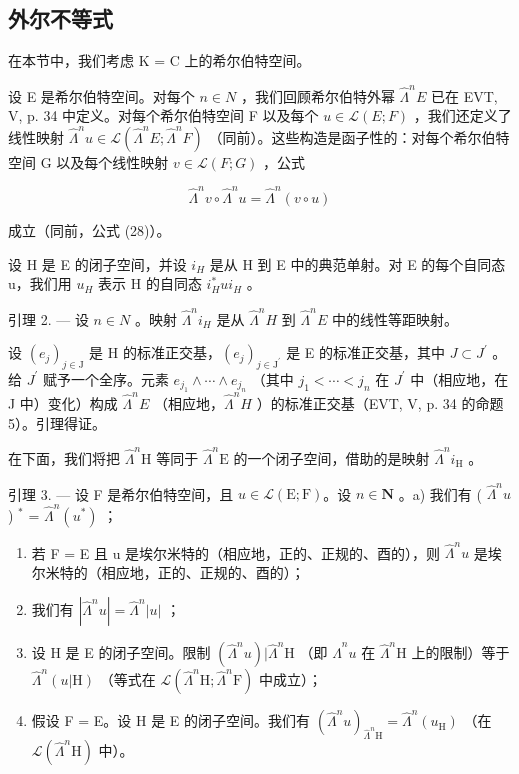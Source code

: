 \subsection{外尔不等式}

在本节中，我们考虑 K = C 上的希尔伯特空间。

设 E 是希尔伯特空间。对每个 \(n \in N\) ，我们回顾希尔伯特外幂 \(\hat{\Lambda}^{n}E\) 已在 EVT, V, p. 34 中定义。对每个希尔伯特空间 F 以及每个 \(u \in \mathcal{L}(E;F)\) ，我们还定义了线性映射 \(\hat{\Lambda}^{n}u \in \mathcal{L}(\hat{\Lambda}^{n}E;\hat{\Lambda}^{n}F)\) （同前）。这些构造是函子性的：对每个希尔伯特空间 G 以及每个线性映射 \(v \in \mathcal{L}(F;G)\) ，公式

\[
\widehat {\Lambda} ^ {n} v \circ \widehat {\Lambda} ^ {n} u = \widehat {\Lambda} ^ {n} (v \circ u)
\]

成立（同前，公式 (28)）。

设 H 是 E 的闭子空间，并设 \(i_{H}\) 是从 H 到 E 中的典范单射。对 E 的每个自同态 u，我们用 \(u_{H}\) 表示 H 的自同态 \(i_{H}^{*}ui_{H}\) 。

引理 2. --- 设 \(n \in N\) 。映射 \(\hat{\Lambda}^{n}i_{H}\) 是从 \(\hat{\Lambda}^{n}H\) 到 \(\hat{\Lambda}^{n}E\) 中的线性等距映射。

设 \((e_{j})_{j\in\mathrm{J}}\) 是 H 的标准正交基，\((e_{j})_{j\in\mathrm{J}^{\prime}}\) 是 E 的标准正交基，其中 \(J\subset J^{\prime}\) 。给 \(J^{\prime}\) 赋予一个全序。元素 \(e_{j_{1}}\wedge\cdots\wedge e_{j_{n}}\) （其中 \(j_{1}<\cdots<j_{n}\) 在 \(J^{\prime}\) 中（相应地，在 J 中）变化）构成 \(\widehat{\Lambda}^{n}E\) （相应地，\(\widehat{\Lambda}^{n}H\) ）的标准正交基（EVT, V, p. 34 的命题 5）。引理得证。

在下面，我们将把 \(\hat{\Lambda}^n\mathrm{H}\) 等同于 \(\hat{\Lambda}^n\mathrm{E}\) 的一个闭子空间，借助的是映射 \(\hat{\Lambda}^n i_{\mathrm{H}}\) 。

引理 3. --- 设 F 是希尔伯特空间，且 \(u \in \mathcal{L}(\mathrm{E};\mathrm{F})\)。设 \(n \in \mathbf{N}\) 。a) 我们有 ( \(\widehat{\Lambda}^n u\) ) \(^*\) = \(\widehat{\Lambda}^n (u^*)\) ；

\begin{enumerate}
\def\labelenumi{\alph{enumi})}
\setcounter{enumi}{1}
\item
  若 F = E 且 u 是埃尔米特的（相应地，正的、正规的、酉的），则 \(\hat{\Lambda}^{n}u\) 是埃尔米特的（相应地，正的、正规的、酉的）；
\item
  我们有 \(|\widehat{\Lambda}^n u| = \widehat{\Lambda}^n |u|\) ；
\item
  设 H 是 E 的闭子空间。限制 \((\widehat{\Lambda}^{n}u)|\widehat{\Lambda}^{n}\mathrm{H}\) （即 \(\widehat{\Lambda}^{n}u\) 在 \(\widehat{\Lambda}^{n}\mathrm{H}\) 上的限制）等于 \(\widehat{\Lambda}^{n}(u|\mathrm{H})\) （等式在 \(\mathcal{L}(\widehat{\Lambda}^{n}\mathrm{H};\widehat{\Lambda}^{n}\mathrm{F})\) 中成立）；
\item
  假设 F = E。设 H 是 E 的闭子空间。我们有 \((\hat{\Lambda}^{n}u)_{\hat{\Lambda}^{n}\mathrm{H}}=\hat{\Lambda}^{n}(u_{\mathrm{H}})\) （在 \(\mathcal{L}(\hat{\Lambda}^{n}\mathrm{H})\) 中）。
\end{enumerate}

